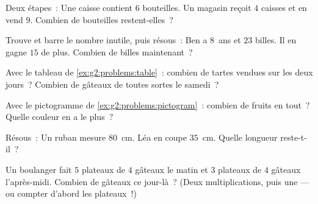 \begin{exercise}[$\star$]\label{exo:g2:problems:5}
Deux étapes~: \guillemotleft{} Une caisse contient $6$ bouteilles.
Un magasin reçoit $4$ caisses et en vend $9$. Combien de
bouteilles restent-elles~? \guillemotright{}
\end{exercise}

\begin{exercise}[$\star$]\label{exo:g2:problems:6}
Trouve et barre le nombre inutile, puis résous~:
\guillemotleft{} Ben a $8$~ans et $23$ billes. Il en gagne $15$ de
plus. Combien de billes maintenant~? \guillemotright{}
\end{exercise}

\begin{exercise}[$\star$]\label{exo:g2:problems:7}
Avec le tableau de \cref{ex:g2:problems:table}~: combien de tartes
vendues sur les deux jours~? Combien de gâteaux de toutes sortes
le samedi~?
\end{exercise}

\begin{exercise}[$\star$]\label{exo:g2:problems:8}
Avec le pictogramme de \cref{ex:g2:problems:pictogram}~: combien de
fruits en tout~? Quelle couleur en a le plus~?
\end{exercise}

\begin{exercise}[$\star$]\label{exo:g2:problems:9}
Résous~: \guillemotleft{} Un ruban mesure $80$~cm. Léa en coupe
$35$~cm. Quelle longueur reste-t-il~? \guillemotright{}
\end{exercise}

\begin{exercise}[$\star\star$]\label{exo:g2:problems:10}
\guillemotleft{} Un boulanger fait $5$ plateaux de $4$ gâteaux le
matin et $3$ plateaux de $4$ gâteaux l'après-midi. Combien de
gâteaux ce jour-là~? \guillemotright{} (Deux multiplications,
puis une  --- ou compter d'abord les plateaux~!)
\end{exercise}
